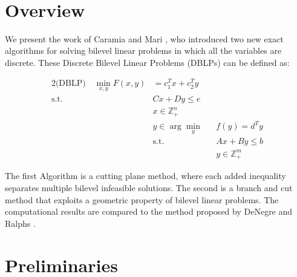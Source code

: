 \documentclass{article}
\title{
	\centering
	\begin{figure}[!hb]
		\begin{minipage}{1\textwidth}
			\hspace*{-.06\linewidth}
		\end{minipage} 
	\end{figure}
	\vspace{5cm}
	{\huge\textbf{\Title}}\\ 
	\vspace{1cm}
	{\huge{\Seminar}\\}
	\vspace{0.6cm} 
	{\mdseries\large \Author }
	\vspace{1cm}
}
\begin{document}
	
	\maketitle
	\newpage
\section{Overview}

We present the work of Caramia and Mari \cite{Caramia2015}, who introduced two new exact algorithms for solving bilevel linear problems in which all the variables are discrete. These Discrete Bilevel Linear Problems (DBLPs) can be defined as:

		\begin{alignat*}{2}
		\text{(DBLP)} \quad \min_{x,y} F(x,y) &= c_1^Tx +c_2^Ty&& \\
		\text{s.t.} \quad &Cx + Dy \le e&& \\
		&x \in \mathbb{Z}^n_+ \\
		&y \in \arg \min_y&& f(y) = d^T y \\
		&\text{s.t.} &&Ax+By \le b \\
		& &&y \in \mathbb{Z}^m_+
		\end{alignat*}
		
The first Algorithm is a cutting plane method, where each added inequality separates multiple bilevel infeasible solutions. The second is a branch and cut method that exploits a geometric property of bilevel linear problems. 
The computational results are compared to the method proposed by DeNegre and Ralphs \cite{DeNegre2009}.

\section{Preliminaries}
\end{document}
